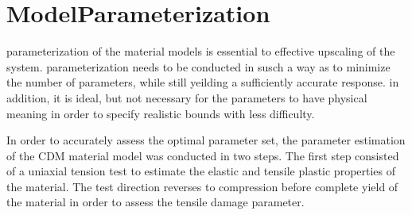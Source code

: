 \section{ModelParameterization}
parameterization of the material models is essential to effective upscaling of the system. parameterization needs to be conducted in susch a way as to minimize the number of parameters, while still yeilding a sufficiently accurate response. in addition, it is ideal, but not necessary for the parameters to have physical meaning in order to specify realistic bounds with less difficulty.

In order to accurately assess the optimal parameter set, the parameter estimation of the CDM material model was conducted in two steps. The first step consisted of a uniaxial tension test to estimate the elastic and tensile plastic properties of the material. The test direction reverses to compression before complete yield of the material in order to assess the tensile damage parameter. 

